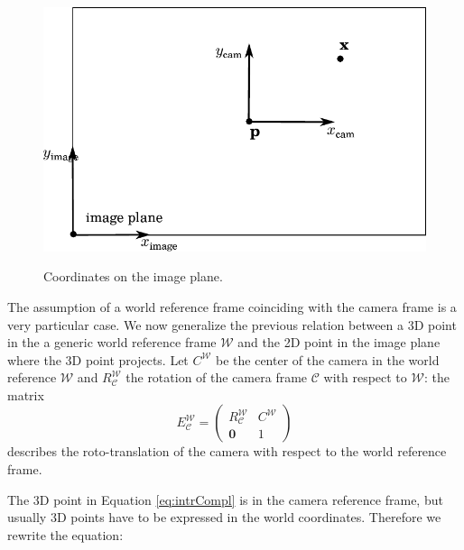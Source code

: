 \begin{figure}[t]
\centering
  \includegraphics[width=0.9\columnwidth]{./img/ch-camera/camera02}\\
 \caption{Coordinates on the image plane.}
 \label{fig:centercamera}
\end{figure}
The assumption of a world reference frame coinciding with the camera frame is a very particular case. We now generalize the previous relation between a 3D point in the a generic world reference frame $\mathcal{W}$ and the 2D point in the image plane where the 3D point projects.
Let $C^\mathcal{W}$ be the center of the camera in the world reference $\mathcal{W}$ and  $R_\mathcal{C}^\mathcal{W}$ the rotation of the camera frame $\mathcal{C}$ with respect to $\mathcal{W}$: the matrix 
\begin{equation}
E_\mathcal{C}^\mathcal{W} = 
\begin{pmatrix}
R_\mathcal{C}^\mathcal{W} &C^\mathcal{W}\\
\mathbf{0}&1
 \end{pmatrix}   
\end{equation}
 describes the roto-translation of the camera with respect to the world reference frame.

The 3D point in Equation \ref{eq:intrCompl} is in the camera reference frame, but usually 3D points have to be expressed in the world coordinates. Therefore we rewrite the equation:


